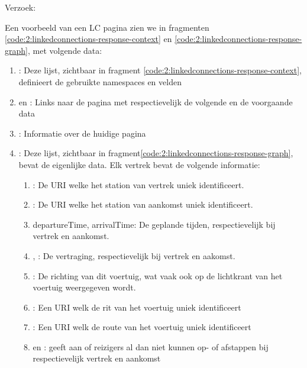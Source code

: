 Verzoek: 

Een voorbeeld van een LC pagina zien we in fragmenten \ref{code:2:linkedconnections-response-context} en \ref{code:2:linkedconnections-response-graph}, met volgende data:
\begin{enumerate}
	\item {}: Deze lijst, zichtbaar in fragment \ref{code:2:linkedconnections-response-context}, definieert de gebruikte namespaces en velden
	\item {} en  : Links naar de pagina met respectievelijk de volgende en de voorgaande data
	\item {}: Informatie over de huidige pagina
	\item {}: Deze lijst, zichtbaar in fragment\ref{code:2:linkedconnections-response-graph},  bevat de eigenlijke data. Elk vertrek bevat de volgende informatie:
	\begin{enumerate}
			\item {}: De URI welke het station van vertrek uniek identificeert.
			\item {}: De URI welke het station van aankomst uniek identificeert.	\item departureTime, arrivalTime: De geplande tijden, respectievelijk bij vertrek en aankomst.
			\item {}, : De vertraging, respectievelijk bij vertrek en aakomst.
			\item {}: De richting van dit voertuig, wat vaak ook op de lichtkrant van het voertuig weergegeven wordt.
			\item {}: Een URI welk de rit van het voertuig uniek identificeert
			\item {}: Een URI welk de route van het voertuig uniek identificeert
			\item {} en : geeft aan of reizigers al dan niet kunnen op- of afstappen bij respectievelijk vertrek en aankomst
	\end{enumerate}
\end{enumerate}

